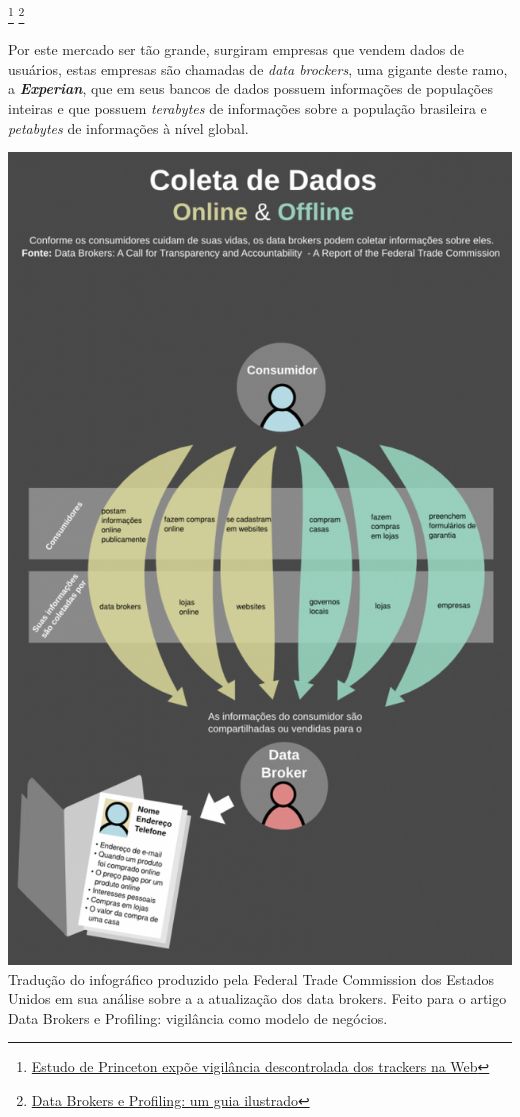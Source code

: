 \documentclass[12pt, letterpaper]{report}
\begin{document}
\footnote{\href{https://antivigilancia.org/pt/2016/06/webcensus/}{Estudo de Princeton expõe vigilância descontrolada dos trackers na Web}}
\footnote{\href{https://antivigilancia.org/pt/2015/05/data-brokers-e-profiling-um-guia-ilustrado/}{Data Brokers e Profiling: um guia ilustrado}}

	Por este mercado ser tão grande, surgiram empresas que vendem dados de usuários, estas empresas são chamadas de \textit{data brockers}, uma gigante deste ramo, a \textbf{\textit{Experian}}, que em seus bancos de dados possuem informações de populações inteiras e que possuem \textit{terabytes} de informações sobre a população brasileira e \textit{petabytes} de informações à nível global.\\

	\begin{center}
		\includegraphics[scale=0.60]{databrokers.png}\\
		\footnotesize Tradução do infográfico produzido pela Federal Trade Commission dos Estados Unidos em sua análise sobre a a atualização dos data brokers. Feito para o artigo Data Brokers e Profiling: vigilância como modelo de negócios.
	\end{center}
\end{document}
